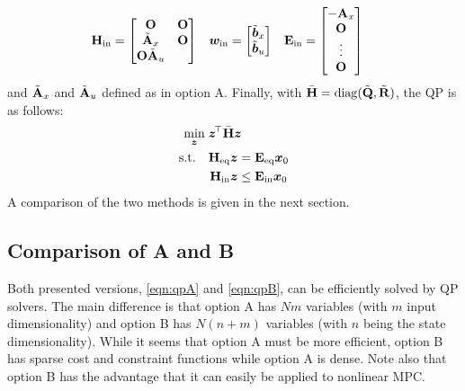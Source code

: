			\begin{align}
				\bm{\mathrm{H}}_\mathrm{in} &=
					\begin{bmatrix}
						\bm{\mathrm{O}}                   & \bm{\mathrm{O}} \\
						\tilde{\bm{\mathrm{A}}}_x         & \bm{\mathrm{O}} \\
						\bm{\mathrm{O}} \tilde{\bm{\mathrm{A}}}_u &
					\end{bmatrix} &
				\bm{w}_\mathrm{in} &=
					\begin{bmatrix}
						\tilde{\bm{b}}_x \\
						\tilde{\bm{b}}_u
					\end{bmatrix} &
				\bm{\mathrm{E}}_\mathrm{in} &=
					\begin{bmatrix}
						-\bm{\mathrm{A}}_x \\
						\bm{\mathrm{O}}    \\
						\vdots     \\
						\bm{\mathrm{O}}
					\end{bmatrix}
			\end{align}
			and \(\tilde{\bm{\mathrm{A}}}_x\) and \(\tilde{\bm{\mathrm{A}}}_u\) defined as in option A. Finally, with \( \bar{\bm{\mathrm{H}}} = \operatorname{diag}(\tilde{\bm{\mathrm{Q}}}, \tilde{\bm{\mathrm{R}}}) \), the QP is as follows:
			\begin{equation}
				\begin{aligned}
					\min_{\bm{z}}\; & \bm{z}^{\!\top} \bar{\bm{\mathrm{H}}} \bm{z} \\
					\text{s.t.}\quad &
						\begin{aligned}[t]
							\bm{\mathrm{H}}_\mathrm{eq} \bm{z} &= \bm{\mathrm{E}}_\mathrm{eq} \bm{x}_0 \\
							\bm{\mathrm{H}}_\mathrm{in} \bm{z} &\leq \bm{\mathrm{E}}_\mathrm{in} \bm{x}_0
						\end{aligned}
				\end{aligned}
				\label{eqn:qpB}
			\end{equation}
			A comparison of the two methods is given in the next section.

		\subsection{Comparison of A and B}
			Both presented versions, \eqref{eqn:qpA} and \eqref{eqn:qpB}, can be efficiently solved by QP solvers. The main difference is that option A has \(Nm\) variables (with \(m\) input dimensionality) and option B has \(N (n + m)\) variables (with \(n\) being the state dimensionality). While it seems that option A must be more efficient, option B has sparse cost and constraint functions while option A is dense. Note also that option B has the advantage that it can easily be applied to nonlinear MPC.

